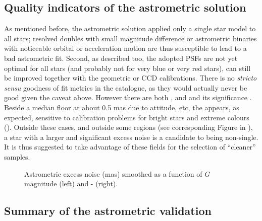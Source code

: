 \subsection{Quality indicators of the astrometric solution}\label{sec:quality_indic}

As mentioned before, the {} astrometric solution applied only a single star
model to all stars; resolved doubles with small magnitude difference or astrometric 
binaries with noticeable orbital or acceleration motion are thus susceptible
to lead to a bad astrometric fit. Second, as described too, the adopted PSFs are not yet
optimal for all stars (and probably not for very blue or very red stars),
can still be improved together with the geometric or CCD calibrations. There is
no {\em stricto sensu} goodness of fit metrics in the catalogue, as they would actually 
never be good given the caveat above. However there are both 
,  and 
 and its significance .
Beside a median floor at about 0.5 mas due to attitude, etc, 
the  appears, 
as expected, sensitive to calibration problems for bright stars and extreme colours 
(). Outside these cases, and outside some regions
(see corresponding Figure in ), a star with a larger
and significant excess noise is a candidate to being non-single. It is thus
suggested to take advantage of these fields for the selection of ``cleaner'' samples.

\begin{figure}[]
\begin{center}
\caption{Astrometric excess noise (mas) smoothed as a function of $G$ magnitude (left) 
and {\gbp-\grp} (right).}\label{fig:cu9val_942_excessnoise}
\end{center}
\end{figure}





\subsection{Summary of the astrometric validation}\label{sec:summary-astro}

